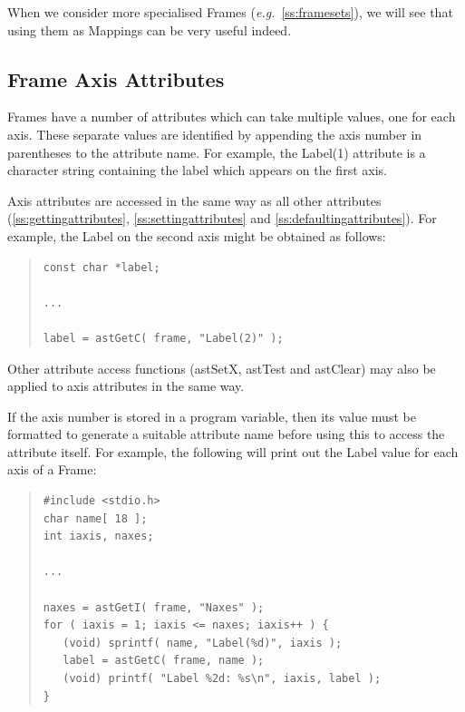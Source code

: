 \documentclass[twoside,11pt]{article}
\newcommand{\htmlref}[2]{#1}
\newcommand{\secref}[1]{\S\ref{#1}}
\renewcommand{\secref}[1]{\ref{#1}}
\begin{document}
When we consider more specialised Frames
({\em{e.g.}}~\secref{ss:framesets}), we will see that using them as
Mappings can be very useful indeed.

\subsection{\label{ss:frameaxisattributes}Frame Axis Attributes}

Frames have a number of attributes which can take multiple values, one
for each axis. These separate values are identified by appending the
axis number in parentheses to the attribute name. For example, the
Label(1) attribute is a character string containing the label which
appears on the first axis.

\htmlref{Axis}{Axis} attributes are accessed in the same way as all other attributes
(\secref{ss:gettingattributes}, \secref{ss:settingattributes} and
\secref{ss:defaultingattributes}). For example, the Label on the second
axis might be obtained as follows:

\begin{quote}
\small
\begin{verbatim}
const char *label;

...

label = astGetC( frame, "Label(2)" );
\end{verbatim}
\normalsize
\end{quote}

Other attribute access functions (astSetX, \htmlref{astTest}{astTest} and \htmlref{astClear}{astClear}) may
also be applied to axis attributes in the same way.

If the axis number is stored in a program variable, then its value
must be formatted to generate a suitable attribute name before using
this to access the attribute itself. For example, the following will
print out the Label value for each axis of a \htmlref{Frame}{Frame}:

\begin{quote}
\small
\begin{verbatim}
#include <stdio.h>
char name[ 18 ];
int iaxis, naxes;

...

naxes = astGetI( frame, "Naxes" );
for ( iaxis = 1; iaxis <= naxes; iaxis++ ) {
   (void) sprintf( name, "Label(%d)", iaxis );
   label = astGetC( frame, name );
   (void) printf( "Label %2d: %s\n", iaxis, label );
}
\end{verbatim}
\normalsize
\end{quote}
\end{document}
